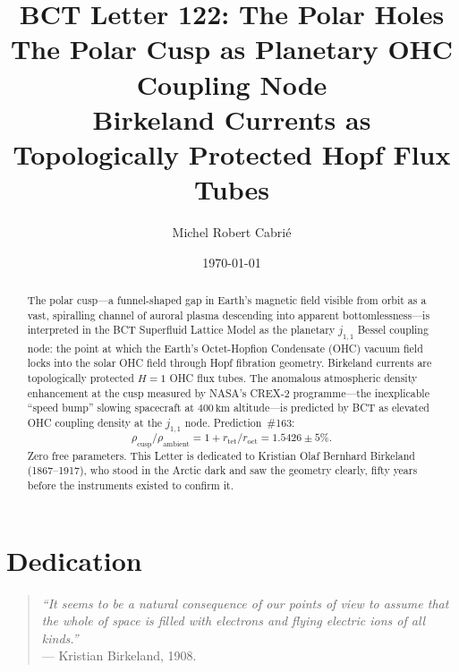 \documentclass[aps,prl,twocolumn,superscriptaddress,floatfix]{revtex4-2}
\begin{document}
\title{BCT Letter 122: The Polar Holes\\
\large The Polar Cusp as Planetary OHC Coupling Node\\
\large Birkeland Currents as Topologically Protected Hopf Flux Tubes}

\author{Michel Robert Cabri\'{e}}
\date{\today}

\begin{abstract}
The polar cusp---a funnel-shaped gap in Earth's magnetic field visible
from orbit as a vast, spiralling channel of auroral plasma descending
into apparent bottomlessness---is interpreted in the BCT Superfluid
Lattice Model as the planetary $j_{1,1}$ Bessel coupling node: the
point at which the Earth's Octet-Hopfion Condensate (OHC) vacuum field
locks into the solar OHC field through Hopf fibration geometry.
Birkeland currents are topologically protected $H=1$ OHC flux tubes.
The anomalous atmospheric density enhancement at the cusp measured by
NASA's CREX-2 programme---the inexplicable ``speed bump'' slowing
spacecraft at $400\,\mathrm{km}$ altitude---is predicted by BCT as
elevated OHC coupling density at the $j_{1,1}$ node.
Prediction~\#163:
\begin{equation*}
\rho_\mathrm{cusp}/\rho_\mathrm{ambient}
= 1 + r_\mathrm{tet}/r_\mathrm{oct} = 1.5426\pm 5\%.
\end{equation*}
Zero free parameters.
This Letter is dedicated to Kristian Olaf Bernhard Birkeland
(1867--1917), who stood in the Arctic dark and saw the geometry
clearly, fifty years before the instruments existed to confirm it.
\end{abstract}

\maketitle

\section{Dedication}

\begin{quotation}
\noindent\textit{``It seems to be a natural consequence of our points
of view to assume that the whole of space is filled with electrons
and flying electric ions of all kinds.''}\\
\hfill --- Kristian Birkeland, 1908.
\end{quotation}
\end{document}
